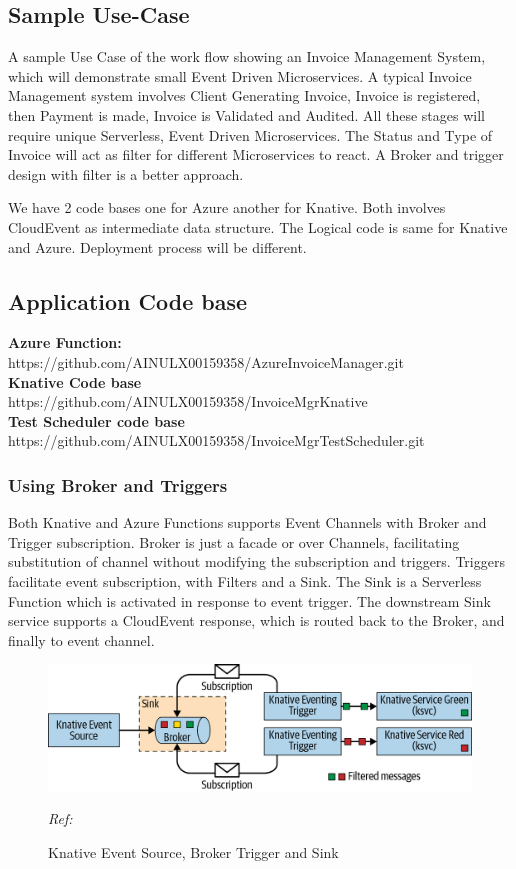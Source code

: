 \documentclass[12pt]{article}
\begin{document}
\begin{flushleft}
\section{Sample Use-Case}
A sample Use Case of the work flow showing an Invoice Management System, which will demonstrate small Event Driven Microservices. A typical Invoice Management system involves Client Generating Invoice, Invoice is registered, then Payment is made, Invoice is Validated and Audited. All these stages will require unique Serverless, Event Driven Microservices. The Status and Type of Invoice will act as filter for different Microservices to react. A Broker and trigger design with filter is a better approach.

We have 2 code bases one for Azure another for Knative. Both involves CloudEvent as intermediate data structure. The Logical code is same for Knative and Azure. Deployment process will be different. 

\subsection{Application Code base}
\textbf{Azure Function:}\\
https://github.com/AINULX00159358/AzureInvoiceManager.git \\
\textbf{Knative Code base}\\ 
https://github.com/AINULX00159358/InvoiceMgrKnative\\
\textbf{Test Scheduler code base}\\ https://github.com/AINULX00159358/InvoiceMgrTestScheduler.git
\pagebreak
\subsubsection{Using Broker and Triggers}
Both Knative and Azure Functions supports Event Channels with Broker and Trigger subscription.
Broker is just a facade or over Channels, facilitating substitution of channel without modifying the subscription and triggers.
Triggers facilitate event subscription, with Filters and a Sink. The Sink is a Serverless Function which is activated in response to event trigger.
The downstream Sink service supports a CloudEvent response, which is routed back to the Broker, and finally to event channel. 
\begin{figure}
    \centering
    \includegraphics[width=1.00\linewidth]{images/knative-event-broker.png}
    \caption{Knative Event Source, Broker Trigger and Sink}
    \textit{
    Ref: \cite{Sutter_Sampath_2020}}


\end{figure}
\end{flushleft}
\end{document}
